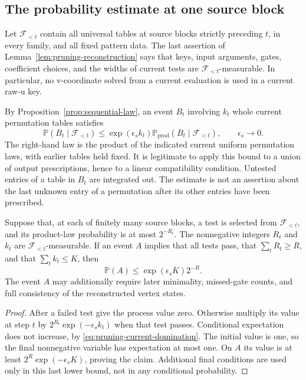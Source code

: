 \subsection{The probability estimate at one source block}

Let $\mathcal F_{<t}$ contain all universal tables at source blocks
strictly preceding $t$, in every family, and all fixed pattern data.
The last assertion of Lemma~\ref{lem:pruning-reconstruction} says
that keys, input arguments, gates, coefficient choices, and the
widths of current tests are $\mathcal F_{<t}$-measurable.  In
particular, no v-coordinate solved from a current evaluation is
used in a current raw-u key.

By Proposition~\ref{prop:sequential-law}, an event $B_t$ involving
$k_t$ whole current permutation tables satisfies
\begin{equation}
\label{eq:pruning-current-domination}
 \mathbb P(B_t\mid\mathcal F_{<t})
 \leq \exp(\epsilon_s k_t)
       \mathbb P_{\mathrm{prod}}(B_t\mid\mathcal F_{<t}),
 \qquad \epsilon_s\longrightarrow0.
\end{equation}
The right-hand law is the product of the indicated current uniform
permutation laws, with earlier tables held fixed.  It is legitimate
to apply this bound to a union of output prescriptions, hence to a
linear compatibility condition.  Untested entries of a table in
$B_t$ are integrated out.  The estimate is not an assertion about
the last unknown entry of a permutation after its other entries
have been prescribed.

\begin{lemma}
\label{lem:pruning-rank-process}
Suppose that, at each of finitely many source blocks, a test is
selected from $\mathcal F_{<t}$, and its product-law probability is
at most $2^{-R_t}$.  The nonnegative integers $R_t$ and $k_t$ are
$\mathcal F_{<t}$-measurable.  If an event $A$ implies that all tests
pass, that $\sum_tR_t\geq R$, and that $\sum_tk_t\leq K$, then
\[
 \mathbb P(A)\leq \exp(\epsilon_sK)2^{-R}.
\]
The event $A$ may additionally require later minimality, missed-gate
counts, and full consistency of the reconstructed vertex states.
\end{lemma}

\begin{proof}
After a failed test give the process value zero.  Otherwise multiply
its value at step $t$ by $2^{R_t}\exp(-\epsilon_s k_t)$ when that
test passes.  Conditional expectation does not increase, by
\eqref{eq:pruning-current-domination}.  The initial value is one,
so the final nonnegative variable has expectation at most one.
On $A$ its value is at least $2^R\exp(-\epsilon_sK)$, proving the
claim.  Additional final conditions are used only in this last
lower bound, not in any conditional probability.
\end{proof}

